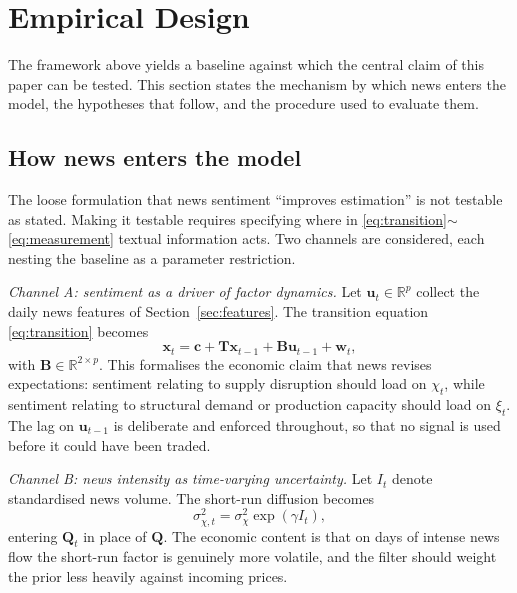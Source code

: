 \documentclass[journal]{IEEEtran}
\newcommand{\rng}{\ensuremath{\sim}}
\begin{document}
\section{Empirical Design}
\label{sec:empirical}

The framework above yields a baseline against which the central claim of this paper can be tested. This section states the mechanism by which news enters the model, the hypotheses that follow, and the procedure used to evaluate them.

\subsection{How news enters the model}

The loose formulation that news sentiment ``improves estimation'' is not testable as stated. Making it testable requires specifying where in \eqref{eq:transition}\rng{}\eqref{eq:measurement} textual information acts. Two channels are considered, each nesting the baseline as a parameter restriction.

\emph{Channel A: sentiment as a driver of factor dynamics.} Let $\bm{u}_t \in \mathbb{R}^{p}$ collect the daily news features of Section~\ref{sec:features}. The transition equation \eqref{eq:transition} becomes
%
\begin{equation}
  \bm{x}_t = \bm{c} + \bm{T}\bm{x}_{t-1} + \bm{B}\bm{u}_{t-1} + \bm{w}_t ,
  \label{eq:channelA}
\end{equation}
%
with $\bm{B} \in \mathbb{R}^{2\times p}$. This formalises the economic claim that news revises expectations: sentiment relating to supply disruption should load on $\chi_t$, while sentiment relating to structural demand or production capacity should load on $\xi_t$. The lag on $\bm{u}_{t-1}$ is deliberate and enforced throughout, so that no signal is used before it could have been traded.

\emph{Channel B: news intensity as time-varying uncertainty.} Let $I_t$ denote standardised news volume. The short-run diffusion becomes
%
\begin{equation}
  \sigma_{\chi,t}^{2} = \sigma_\chi^{2}\exp(\gamma I_t) ,
  \label{eq:channelB}
\end{equation}
%
entering $\bm{Q}_t$ in place of $\bm{Q}$. The economic content is that on days of intense news flow the short-run factor is genuinely more volatile, and the filter should weight the prior less heavily against incoming prices.
\end{document}
